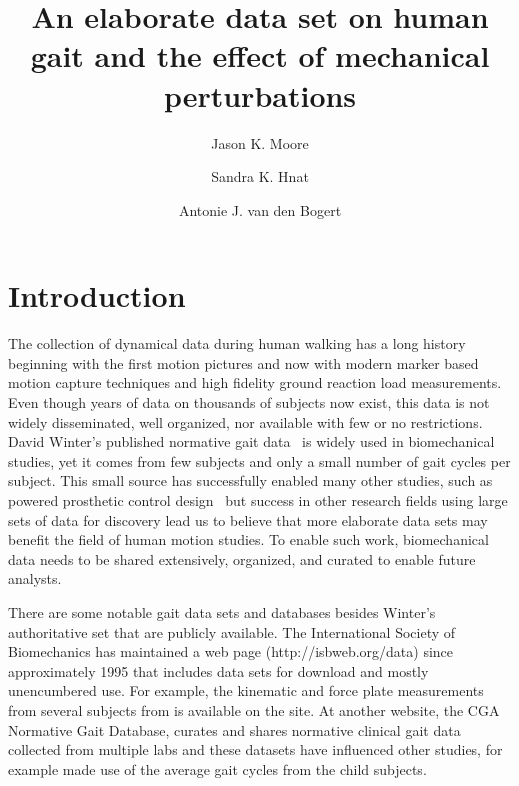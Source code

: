 \documentclass[fleqn,12pt]{wlpeerj}
\title{An elaborate data set on human gait and the effect of mechanical
  perturbations}
\author[1]{Jason K. Moore}
\author[1]{Sandra K. Hnat}
\author[1]{Antonie J. van den Bogert}
\affil[1]{Mechanical Engineering, Cleveland State University, Cleveland, Ohio,
  USA, 44115. j.k.moore19@csuohio.edu, s.hnat@vikes.csuohio.edu,
  a.vandenbogert@csuohio.edu}
\begin{document}
\flushbottom
\maketitle
\thispagestyle{empty}

\section*{Introduction}
%
The collection of dynamical data during human walking has a long history
beginning with the first motion pictures and now with modern marker based
motion capture techniques and high fidelity ground reaction load measurements.
Even though years of data on thousands of subjects now exist, this data is not
widely disseminated, well organized, nor available with few or no restrictions.
David Winter's published normative gait data~\citep{Winter1990} is widely used
in biomechanical studies, yet it comes from few subjects and only a small
number of gait cycles per subject. This small source has successfully enabled
many other studies, such as powered prosthetic control design~\citep{Sup2008}
but success in other research fields using large sets of data for discovery
lead us to believe that more elaborate data sets may benefit the field of
human motion studies. To enable such work, biomechanical data needs to be
shared extensively, organized, and curated to enable future analysts.

There are some notable gait data sets and databases besides Winter's
authoritative set that are publicly available. The International Society of
Biomechanics has maintained a web page (http://isbweb.org/data) since
approximately 1995 that includes data sets for download and mostly unencumbered
use. For example, the kinematic and force plate measurements from several
subjects from \cite{Vaughan1992} is available on the site. At another website,
the CGA Normative Gait Database, \cite{Kirtley2014} curates and shares
normative clinical gait data collected from multiple labs and these datasets
have influenced other studies, for example \cite{Bogert2003} made use of the
average gait cycles from the child subjects.
\end{document}
